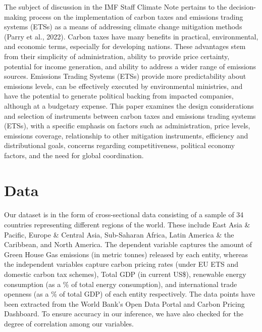 \documentclass[12pt]{article}
\begin{document}
The subject of discussion in the IMF Staff Climate Note pertains to the decision-making process on the implementation of carbon taxes and emissions trading systems (ETSs) as a means of addressing climate change mitigation methods (Parry et al., 2022). Carbon taxes have many benefits in practical, environmental, and economic terms, especially for developing nations. These advantages stem from their simplicity of administration, ability to provide price certainty, potential for income generation, and ability to address a wider range of emissions sources. Emissions Trading Systems (ETSs) provide more predictability about emissions levels, can be effectively executed by environmental ministries, and have the potential to generate political backing from impacted companies, although at a budgetary expense. This paper examines the design considerations and selection of instruments between carbon taxes and emissions trading systems (ETSs), with a specific emphasis on factors such as administration, price levels, emissions coverage, relationship to other mitigation instruments, efficiency and distributional goals, concerns regarding competitiveness, political economy factors, and the need for global coordination.



\section{Data}
\paragraph{}
Our dataset is in the form of cross-sectional data consisting of a sample of 34 countries representing different regions of the world. These include East Asia \& Pacific, Europe \& Central Asia, Sub-Saharan Africa, Latin America \& the Caribbean, and North America. The dependent variable captures the amount of Green House Gas emissions (in metric tonnes) released by each entity, whereas the independent variables capture carbon pricing rates (under EU ETS and domestic carbon tax schemes), Total GDP (in current US\$), renewable energy consumption (as a \% of total energy consumption), and international trade openness (as a \% of total GDP) of each entity respectively. The data points have been extracted from the World Bank’s Open Data Portal and Carbon Pricing Dashboard.
To ensure accuracy in our inference, we have also checked for the degree of correlation among our variables.
\end{document}
